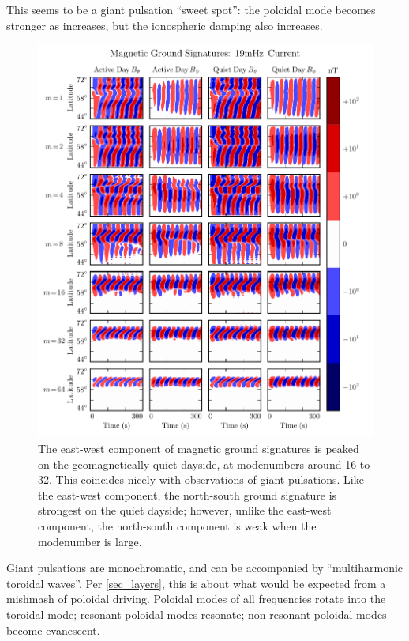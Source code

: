 This seems to be a giant pulsation ``sweet spot'': the poloidal mode becomes stronger as \azm increases, but the ionospheric damping also increases. 

\begin{figure}[H]
    \centering
    \includegraphics[width=\textwidth]{figures/ground_19mHz.pdf}
    \caption[Dayside Ground Magnetic Fields]{
      The east-west component of magnetic ground signatures is peaked on the geomagnetically quiet dayside, at modenumbers around 16 to 32. This coincides nicely with observations of giant pulsations. Like the east-west component, the north-south ground signature is strongest on the quiet dayside; however, unlike the east-west component, the north-south component is weak when the modenumber is large. 
    }
    \label{fig_ground_signatures}
\end{figure}

Giant pulsations are monochromatic, and can be accompanied by ``multiharmonic toroidal waves''\cite{takahashi_2011}. Per \cref{sec_layers}, this is about what would be expected from a mishmash of poloidal driving. Poloidal modes of all frequencies rotate into the toroidal mode; resonant poloidal modes resonate; non-resonant poloidal modes become evanescent. 


